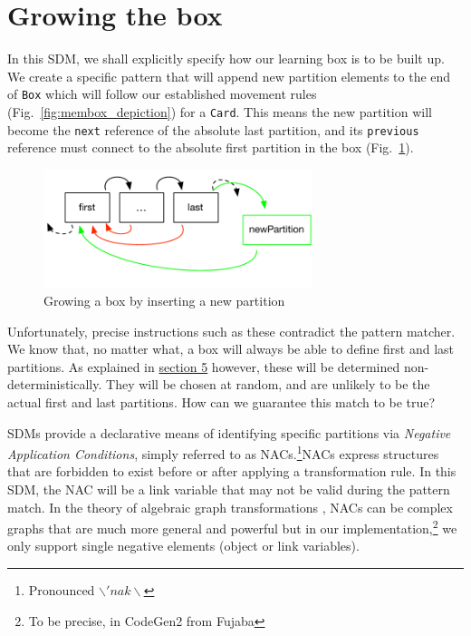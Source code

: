 \newpage
\section{Growing the box}
\genHeader
\hypertarget{sec:growBox}{}

In this SDM, we shall explicitly specify how our learning box is to be built up. We create a specific pattern that will append new partition elements
to the end of \texttt{Box} which will follow our established movement rules (Fig.~\ref{fig:membox_depiction}) for a \texttt{Card}. This means the new partition
will become the \texttt{next} reference of the absolute last partition, and its \texttt{previous} reference must connect to the absolute first partition in the
box (Fig.~\ref{fig:goal_grow}).

\begin{figure}[htbp]
 	\centering
  	\includegraphics[width=0.7\textwidth]{growBoxNACGoal.pdf}
	\caption{Growing a box by inserting a new partition}
	\label{fig:goal_grow}
\end{figure}
\FloatBarrier

Unfortunately, precise instructions such as these contradict the pattern matcher. We know that, no matter what, a box will always be able to
define first and last partitions. As explained in \hyperlink{sec:emptyPartition}{section 5} however, these will be determined non-deterministically. They will
be chosen at random, and are unlikely to be the actual first and last partitions. How can we guarantee this match to be true?

SDMs provide a declarative means of identifying specific partitions via \emph{Negative Application Conditions}, simply referred to as
\mbox{NAC}s.\footnote{Pronounced $\backslash 'nak \backslash$}\mbox{NAC}s express structures that are forbidden to exist before or after applying a
transformation rule. In this SDM, the \mbox{NAC} will be a link variable that may not be valid during the pattern match. In the theory of algebraic
graph transformations \cite{EEPT06}, \mbox{NACs} can be complex graphs that are much more general and powerful but in our implementation,\footnote{To be
precise, in CodeGen2 from Fujaba} we only support single negative elements (object or link variables).

